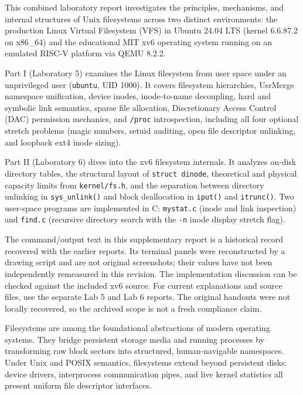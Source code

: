 \documentclass{assets/utmreport}
\begin{document}
\makeutmreporttitlepage
\tableofcontents
\clearpage

\begin{utmabstract}[Abstract]
This combined laboratory report investigates the principles, mechanisms, and internal structures of Unix filesystems across two distinct environments: the production Linux Virtual Filesystem (VFS) in Ubuntu 24.04 LTS (kernel 6.6.87.2 on x86\_64) and the educational MIT xv6 operating system running on an emulated RISC-V platform via QEMU 8.2.2.

Part I (Laboratory 5) examines the Linux filesystem from user space under an unprivileged user (\texttt{ubuntu}, UID 1000). It covers filesystem hierarchies, UsrMerge namespace unification, device inodes, inode-to-name decoupling, hard and symbolic link semantics, sparse file allocation, Discretionary Access Control (DAC) permission mechanics, and \texttt{/proc} introspection, including all four optional stretch problems (magic numbers, setuid auditing, open file descriptor unlinking, and loopback ext4 inode sizing).

Part II (Laboratory 6) dives into the xv6 filesystem internals. It analyzes on-disk directory tables, the structural layout of \texttt{struct dinode}, theoretical and physical capacity limits from \texttt{kernel/fs.h}, and the separation between directory unlinking in \texttt{sys\_unlink()} and block deallocation in \texttt{iput()} and \texttt{itrunc()}. Two user-space programs are implemented in C: \texttt{mystat.c} (inode and link inspection) and \texttt{find.c} (recursive directory search with the \texttt{-n} inode display stretch flag).
\end{utmabstract}

\utmintroduction
The command/output text in this supplementary report is a historical record recovered with the earlier reports. Its terminal panels were reconstructed by a drawing script and are not original screenshots; their values have not been independently remeasured in this revision. The implementation discussion can be checked against the included xv6 source\cite{xv6}. For current explanations and source files, use the separate Lab 5 and Lab 6 reports. The original handouts were not locally recovered, so the archived scope is not a fresh compliance claim.

Filesystems are among the foundational abstractions of modern operating systems. They bridge persistent storage media and running processes by transforming raw block sectors into structured, human-navigable namespaces. Under Unix and POSIX semantics, filesystems extend beyond persistent disks: device drivers, interprocess communication pipes, and live kernel statistics all present uniform file descriptor interfaces.
\end{document}
